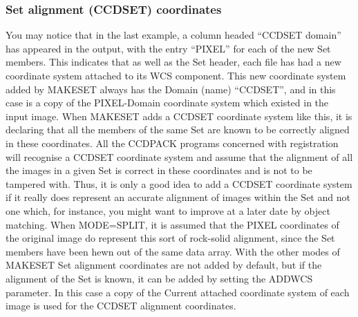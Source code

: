 \documentclass[twoside,11pt]{article}
\newcommand{\xlabel}[1]{}
\renewcommand{\_}{\texttt{\symbol{95}}}
\newcommand{\routine}[1]{{\sc #1}}
\begin{document}
\subsubsection{\label{ccd_set}\xlabel{ccd_set}Set alignment 
               (CCD\_SET) coordinates}

You may notice that in the last example, 
a column headed ``CCD\_SET domain'' has appeared in the output,
with the entry ``PIXEL'' for each of the new Set members.
This indicates that as well as the Set header, each file has
had a new coordinate system attached to its WCS component.
This new coordinate system added by \routine{MAKESET}
always has the Domain (name) ``CCD\_SET'', 
and in this case is a copy of the 
PIXEL-Domain coordinate system which existed
in the input image.
When \routine{MAKESET} adds a CCD\_SET coordinate system like this,
it is declaring that all the members of the same Set are known to
be correctly aligned in these coordinates.
All the CCDPACK programs concerned with registration
will recognise a CCD\_SET coordinate system and assume that 
the alignment of all the images in a given Set is correct in
these coordinates and is not to be tampered with.
Thus, it is only a good idea to add a CCD\_SET coordinate system
if it really does represent an accurate alignment of images within
the Set and not one which, for instance, you might want to improve
at a later date by object matching.
When MODE=SPLIT, it is assumed that the PIXEL coordinates of
the original image do
represent this sort of rock-solid alignment, 
since the Set members have been hewn out of the same data array.
With the other modes of \routine{MAKESET} Set alignment coordinates
are not added by default,
but if the alignment of the Set is known,
it can be added by setting the ADDWCS parameter.  In this case
a copy of the Current attached coordinate system of each image
is used for the CCD\_SET alignment coordinates.
\end{document}
